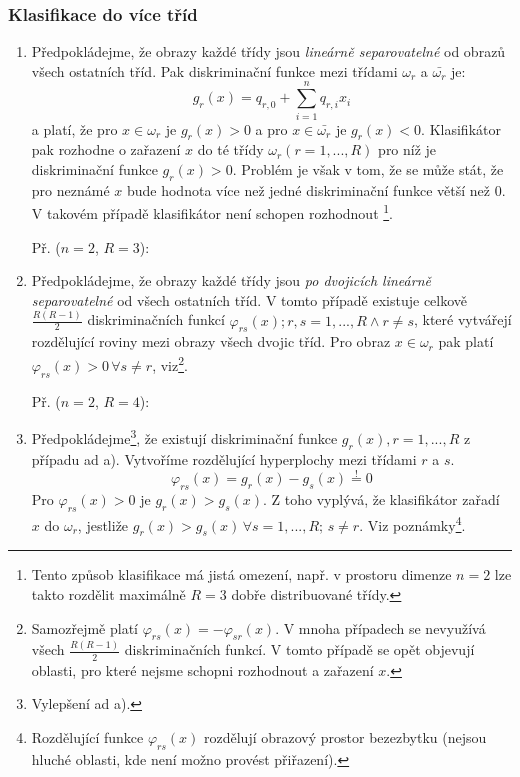 \subsubsection*{Klasifikace do více tříd}
\begin{enumerate}[label=(\alph*)]
\item Předpokládejme, že obrazy každé třídy jsou \textit{lineárně separovatelné} od obrazů všech ostatních tříd. Pak diskriminační funkce mezi třídami $ \omega_r $ a $ \bar{\omega_r} $ je:
\begin{equation}
g_r(x) = q_{r,0} + \displaystyle{\sum_{i=1}^{n}} q_{r,i} x_i
\end{equation}
a platí, že pro $ x \in \omega_r $ je $ g_r(x) > 0 $ a pro $ x \in \bar{\omega_r} $ je $ g_r(x) < 0 $. Klasifikátor pak rozhodne o zařazení $ x $ do té třídy $ \omega_r (r=1,...,R) $ pro níž je diskriminační funkce $ g_r(x) > 0 $. Problém je však v tom, že se může stát, že pro neznámé $ x $ bude hodnota více než jedné diskriminační funkce větší než $ 0 $. V takovém případě klasifikátor není schopen rozhodnout \footnote{Tento způsob klasifikace má jistá omezení, např. v prostoru dimenze $ n = 2 $ lze takto rozdělit maximálně $ R =3 $ dobře distribuované třídy.}.

Př. ($ n=2 $, $ R=3 $):
\vspace{4cm}

\item Předpokládejme, že obrazy každé třídy jsou \textit{po dvojicích lineárně separovatelné} od všech ostatních tříd. V tomto případě existuje celkově $ \frac{R(R-1)}{2} $ diskriminačních funkcí $ \varphi_{rs}(x); r,s = 1,...,R \land r \neq s $, které vytvářejí rozdělující roviny mezi obrazy všech dvojic tříd. Pro obraz $ x \in \omega_r $ pak platí $ \varphi_{rs} (x) > 0 \, \forall s \neq r $, viz\footnote{Samozřejmě platí $ \varphi_{rs}(x) = -\varphi_{sr}(x) $. V mnoha případech se nevyužívá všech $ \frac{R(R-1)}{2} $ diskriminačních funkcí. V tomto případě se opět objevují oblasti, pro které nejsme schopni rozhodnout a zařazení $ x $.}.

Př. ($ n=2 $, $ R=4 $):
\vspace{4cm}

\item Předpokládejme\footnote{Vylepšení ad a).}, že existují diskriminační funkce $ g_r(x), r=1,...,R $ z případu ad a). Vytvoříme rozdělující hyperplochy mezi třídami $ r $ a $ s $.
\begin{equation}
\varphi_{rs}(x) = g_r(x) - g_s(x) \overset{!}{=} 0
\end{equation}
Pro $ \varphi_{rs}(x) > 0 $ je $ g_r(x) > g_s(x) $. Z toho vyplývá, že klasifikátor zařadí $ x $ do $ \omega_r $, jestliže $ g_r(x) > g_s(x) \, \forall s=1,...,R; \, s \neq r $. Viz poznámky\footnote{Rozdělující funkce $ \varphi_{rs}(x) $ rozdělují obrazový prostor bezezbytku (nejsou hluché oblasti, kde není možno provést přiřazení).}.
\vspace{4cm}
\end{enumerate}

